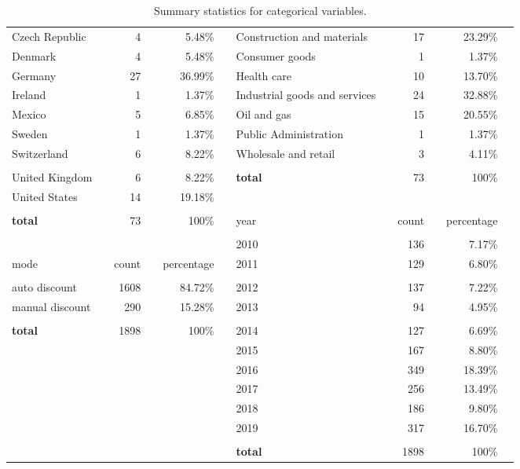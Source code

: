 \documentclass[a4paper,11pt]{article}
\renewcommand{\~}[1]{\tilde{#1}}
\renewcommand{\-}[1]{\overline{#1}}
\begin{document}
\begin{table}[ht]
{{\begin{tabular}{%
lc@{\hspace{.2em}}rc@{\hspace{.2em}}rc@{\hspace{.9em}}lc@{\hspace{.2em}}rc@{\hspace{.2em}}rc
}
 Czech Republic && 4 && 5.48\% && Construction and materials && 17 && 23.29\% \\[3pt] 
 Denmark && 4 && 5.48\% && Consumer goods && 1 && 1.37\% \\[3pt] 
 Germany && 27 && 36.99\% && Health care && 10 && 13.70\% \\[3pt] 
 Ireland && 1 && 1.37\% && Industrial goods and services && 24 && 32.88\% \\[3pt] 
 Mexico && 5 && 6.85\% && Oil and gas && 15 && 20.55\% \\[3pt] 
 Sweden && 1 && 1.37\% && Public Administration && 1 && 1.37\% \\[3pt] 
 Switzerland && 6 && 8.22\% && Wholesale and retail && 3 && 4.11\% \\[3pt] \cline{7-11}\\[-12pt] 
 United Kingdom && 6 && 8.22\% && \textbf{total} && 73 && 100\% \\[3pt] 
 United States && 14 && 19.18\% &&  &&  &&  \\[3pt] \cline{1-5}\\[-12pt] 
 \textbf{total} && 73 && 100\% && year && {count} && {percentage} \\ \cline{7-11}\\[-12pt] 
  &&  &&  && 2010 && 136 && 7.17\% \\[3pt] 
 mode && {count} && {percentage} && 2011 && 129 && 6.80\% \\ \cline{1-5}\\[-12pt] 
 auto discount && 1608 && 84.72\% && 2012 && 137 && 7.22\% \\[3pt] 
 manual discount && 290 && 15.28\% && 2013 && 94 && 4.95\% \\[3pt] \cline{1-5}\\[-12pt] 
 \textbf{total} && 1898 && 100\% && 2014 && 127 && 6.69\% \\[3pt] 
  &&  &&  && 2015 && 167 && 8.80\% \\[3pt] 
  &&  &&  && 2016 && 349 && 18.39\% \\[3pt] 
  &&  &&  && 2017 && 256 && 13.49\% \\[3pt] 
  &&  &&  && 2018 && 186 && 9.80\% \\[3pt] 
  &&  &&  && 2019 && 317 && 16.70\% \\[3pt] \cline{7-11}\\[-12pt] 
  &&  &&  && \textbf{total} && 1898 && 100\% \\\bottomrule
\end{tabular}
}%
}
\caption{Summary statistics for categorical variables.}
\label{tab:demographics}
\end{table}%
\end{document}
